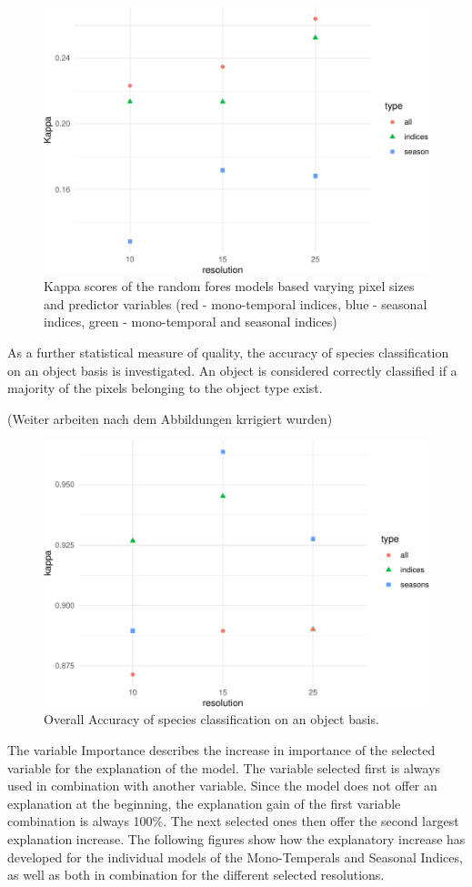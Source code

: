 \documentclass[]{article}
\begin{document}
\begin{figure}[H]

{\centering \includegraphics[width=0.6\linewidth]{report_files/figure-latex/result_plots-1} 

}

\caption{Kappa scores of the random fores models based varying pixel sizes and predictor variables (red - mono-temporal indices, blue - seasonal indices, green - mono-temporal and seasonal indices)}\label{fig:result_plots}
\end{figure}

As a further statistical measure of quality, the accuracy of species
classification on an object basis is investigated. An object is
considered correctly classified if a majority of the pixels belonging to
the object type exist.

(Weiter arbeiten nach dem Abbildungen krrigiert wurden)

\begin{figure}[H]

{\centering \includegraphics[width=0.6\linewidth]{report_files/figure-latex/validation_plots-1} 

}

\caption{Overall Accuracy of species classification on an object basis.}\label{fig:validation_plots}
\end{figure}

The variable Importance describes the increase in importance of the
selected variable for the explanation of the model. The variable
selected first is always used in combination with another variable.
Since the model does not offer an explanation at the beginning, the
explanation gain of the first variable combination is always 100\%. The
next selected ones then offer the second largest explanation increase.
The following figures show how the explanatory increase has developed
for the individual models of the Mono-Temperals and Seasonal Indices, as
well as both in combination for the different selected resolutions.
\end{document}

